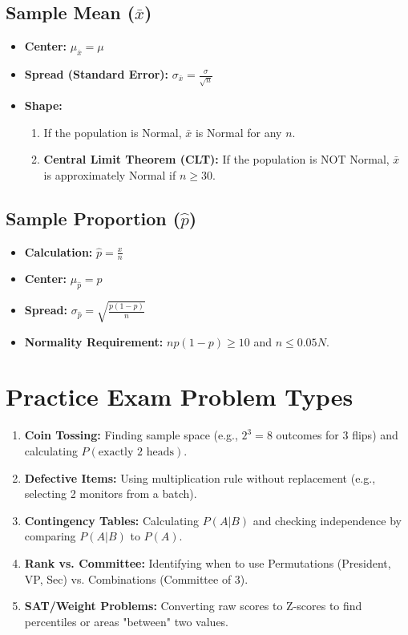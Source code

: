 \documentclass[11pt]{article}
\begin{document}
\subsection{Sample Mean ($\bar{x}$)}
\begin{itemize}
    \item \textbf{Center:} $\mu_{\bar{x}} = \mu$
    \item \textbf{Spread (Standard Error):} $\sigma_{\bar{x}} = \frac{\sigma}{\sqrt{n}}$
    \item \textbf{Shape:} 
        \begin{enumerate}
            \item If the population is Normal, $\bar{x}$ is Normal for any $n$.
            \item \textbf{Central Limit Theorem (CLT):} If the population is NOT Normal, $\bar{x}$ is approximately Normal if $n \geq 30$.
        \end{enumerate}
\end{itemize}

\subsection{Sample Proportion ($\hat{p}$)}
\begin{itemize}
    \item \textbf{Calculation:} $\hat{p} = \frac{x}{n}$
    \item \textbf{Center:} $\mu_{\hat{p}} = p$
    \item \textbf{Spread:} $\sigma_{\hat{p}} = \sqrt{\frac{p(1-p)}{n}}$
    \item \textbf{Normality Requirement:} $np(1-p) \geq 10$ and $n \leq 0.05N$.
\end{itemize}

\section{Practice Exam Problem Types}
\begin{enumerate}
    \item \textbf{Coin Tossing:} Finding sample space (e.g., $2^3 = 8$ outcomes for 3 flips) and calculating $P(\text{exactly 2 heads})$.
    \item \textbf{Defective Items:} Using multiplication rule without replacement (e.g., selecting 2 monitors from a batch).
    \item \textbf{Contingency Tables:} Calculating $P(A|B)$ and checking independence by comparing $P(A|B)$ to $P(A)$.
    \item \textbf{Rank vs. Committee:} Identifying when to use Permutations (President, VP, Sec) vs. Combinations (Committee of 3).
    \item \textbf{SAT/Weight Problems:} Converting raw scores to Z-scores to find percentiles or areas "between" two values.
\end{enumerate}
\end{document}
